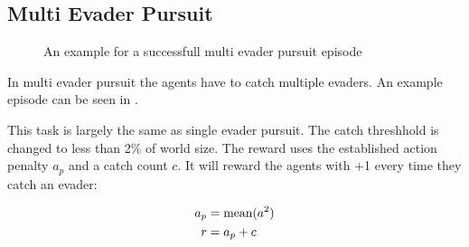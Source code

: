 \subsection{Multi Evader Pursuit}
\begin{figure}[htp]
    \centering
    \hspace{1cm}                       
    \caption{An example for a successfull multi evader pursuit episode}
    \label{fig:multi_evader_example}
\end{figure}

In multi evader pursuit the agents have to catch multiple evaders. An example episode can be seen in .\par

This task is largely the same as single evader pursuit. The catch threshhold is changed to less than 2\% of world size.
The reward uses the established action penalty $a_p$ and a catch count $c$. It will reward the agents with +1 every time they catch an evader:

\begin{equation} 
    \begin{aligned}
        a_p &= \textup{mean}(a^2)\\
        r &= a_p + c
    \end{aligned}
    \nonumber
\end{equation}